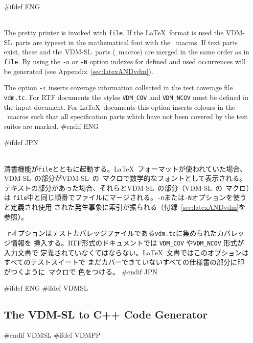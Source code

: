 \documentclass[\pformat,12pt]{article}
\newcommand{\vdmslpp}{VDM-SL}
\newcommand{\VdmSlPp}{\VdmSl}
\newcommand{\vdmslpp}{VDM++}
\DeclareRobustCommand{\VdmSlPp}{VDM++-\VdmSl}
\begin{document}
\begin{description} 

#ifdef ENG
\item[latex (l) \mbox{[{\tt -nNr}]} {\tt file}] \mbox{}\\
  The pretty printer is invoked with {\tt file}.  If the \LaTeX\ format is
  used the \vdmslpp\ 
  parts are typeset in the mathematical font with the \VdmSlPp\ 
  macros.  If text parts exist, these and the \vdmslpp\ parts
  (\VdmSlPp\ macros) are merged in the same order as in {\tt file}.
  By using the {\tt -n} or {\tt -N} option indexes for defined and
  used occurrences will be generated (see
  Appendix~\ref{sec:latexANDvdm}).
  
  The option {\tt -r} inserts coverage information collected in the
test coverage file {\tt vdm.tc}. For RTF documents
the styles {\tt VDM\_COV} and {\tt VDM\_NCOV} must be defined in the
input document.  For \LaTeX\ documents this option inserts colours in
the \VdmSlPp\ macros such that all specification parts which have not
been covered by the test suites are marked.
#endif ENG

#ifdef JPN
\item[latex (l) \mbox{[{\tt -nNr}]} {\tt file}] \mbox{}\\
  清書機能が{\tt file}とともに起動する。\LaTeX\ フォーマットが使われていた場合、
  \vdmslpp\ の部分が\vdmslpp\ の\VdmSlPp\ マクロで数学的なフォントとして表示される。
  テキストの部分があった場合、それらと\vdmslpp\ の部分（\vdmslpp\ の\VdmSlPp\ マクロ）は
  {\tt file}中と同じ順番でファイルにマージされる。{\tt -n}または{\tt -N}オプションを使うと定義され使用
  された発生事象に索引が振られる（付録~\ref{sec:latexANDvdm}を参照）。
  
{\tt -r}オプションはテストカバレッジファイルである{\tt vdm.tc}に集められたカバレッジ情報を
挿入する。RTF形式のドキュメントでは {\tt VDM\_COV} や{\tt VDM\_NCOV} 形式が入力文書で
定義されていなくてはならない。\LaTeX\ 文書ではこのオプションはすべてのテストスイートで
まだカバーできていないすべての仕様書の部分に印がつくように\VdmSlPp\ マクロで
色をつける。
#endif JPN

\end{description}


\newpage
#ifdef ENG
#ifdef VDMSL
\subsection{The VDM-SL to C++ Code Generator}\label{sec:cg}
#endif VDMSL
#ifdef VDMPP
\end{document}
